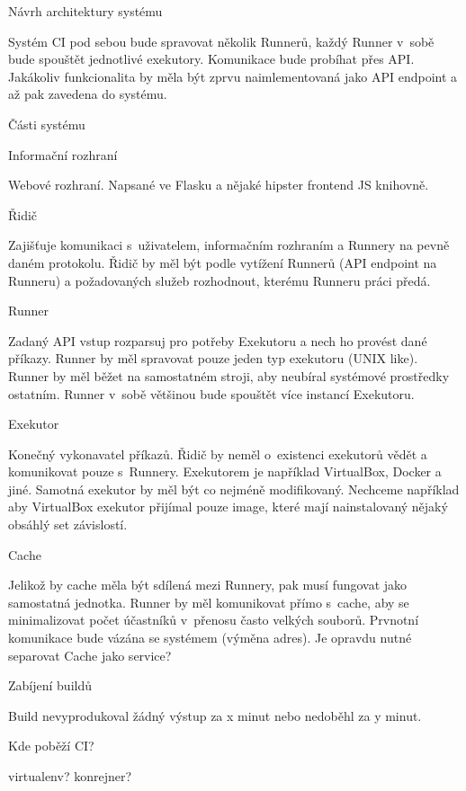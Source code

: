 \chap Návrh architektury systému

Systém CI pod sebou bude spravovat několik Runnerů, každý Runner v~sobě bude spouštět jednotlivé exekutory.
Komunikace bude probíhat přes API.
Jakákoliv funkcionalita by měla být zprvu naimlementovaná jako API endpoint a až pak zavedena do systému.

\sec Části systému

\secc Informační rozhraní

Webové rozhraní.
Napsané ve Flasku a nějaké hipster frontend JS knihovně.

\secc Řidič

Zajišťuje komunikaci s~uživatelem, informačním rozhraním a Runnery na pevně daném protokolu.
Řidič by měl být podle vytížení Runnerů (API endpoint na Runneru) a požadovaných služeb rozhodnout, kterému Runneru práci předá.

\secc Runner

Zadaný API vstup rozparsuj pro potřeby Exekutoru a nech ho provést dané příkazy.
Runner by měl spravovat pouze jeden typ exekutoru (UNIX like).
Runner by měl běžet na samostatném stroji, aby neubíral systémové prostředky ostatním.
Runner v~sobě většinou bude spouštět více instancí Exekutoru.

\seccc Exekutor

Konečný vykonavatel příkazů. Řidič by neměl o~existenci exekutorů vědět a komunikovat pouze s~Runnery.
Exekutorem je například VirtualBox, Docker a jiné.
Samotná exekutor by měl být co nejméně modifikovaný.
Nechceme například aby VirtualBox exekutor přijímal pouze image, které mají nainstalovaný nějaký obsáhlý set závislostí.

\secc Cache

Jelikož by cache měla být sdílená mezi Runnery, pak musí fungovat jako samostatná jednotka.
Runner by měl komunikovat přímo s~cache, aby se minimalizovat počet účastníků v~přenosu často velkých souborů.
Prvnotní komunikace bude vázána se systémem (výměna adres).
Je opravdu nutné separovat Cache jako service?






\sec Zabíjení buildů

Build nevyprodukoval žádný výstup za x minut nebo nedoběhl za y minut.

\sec Kde poběží CI?

virtualenv?
konrejner?
